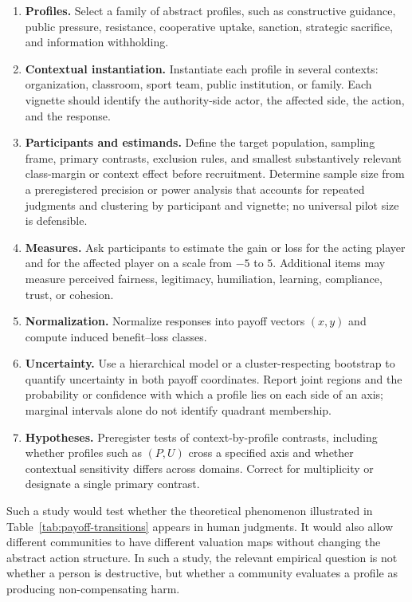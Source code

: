 \documentclass[a4paper,fleqn]{cas-dc}
\theoremstyle{remark}
\begin{document}
\begin{enumerate}[label=(\arabic*)]
\item \textbf{Profiles.} Select a family of abstract profiles, such as constructive guidance, public pressure, resistance, cooperative uptake, sanction, strategic sacrifice, and information withholding.
\item \textbf{Contextual instantiation.} Instantiate each profile in several contexts: organization, classroom, sport team, public institution, or family. Each vignette should identify the authority-side actor, the affected side, the action, and the response.
\item \textbf{Participants and estimands.} Define the target population, sampling frame, primary contrasts, exclusion rules, and smallest substantively relevant class-margin or context effect before recruitment. Determine sample size from a preregistered precision or power analysis that accounts for repeated judgments and clustering by participant and vignette; no universal pilot size is defensible.
\item \textbf{Measures.} Ask participants to estimate the gain or loss for the acting player and for the affected player on a scale from $-5$ to $5$. Additional items may measure perceived fairness, legitimacy, humiliation, learning, compliance, trust, or cohesion.
\item \textbf{Normalization.} Normalize responses into payoff vectors $(x,y)$ and compute induced benefit--loss classes.
\item \textbf{Uncertainty.} Use a hierarchical model or a cluster-respecting bootstrap to quantify uncertainty in both payoff coordinates. Report joint regions and the probability or confidence with which a profile lies on each side of an axis; marginal intervals alone do not identify quadrant membership.
\item \textbf{Hypotheses.} Preregister tests of context-by-profile contrasts, including whether profiles such as $(P,U)$ cross a specified axis and whether contextual sensitivity differs across domains. Correct for multiplicity or designate a single primary contrast.
\end{enumerate}

Such a study would test whether the theoretical phenomenon illustrated in Table~\ref{tab:payoff-transitions} appears in human judgments. It would also allow different communities to have different valuation maps without changing the abstract action structure. In such a study, the relevant empirical question is not whether a person is destructive, but whether a community evaluates a profile as producing non-compensating harm.
\end{document}
